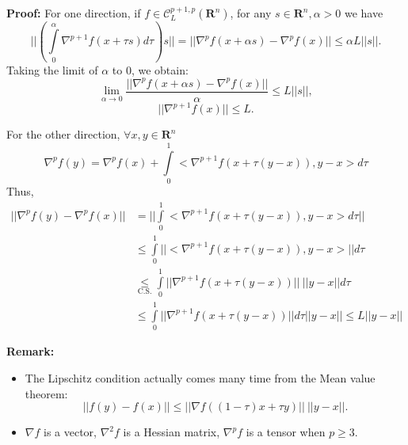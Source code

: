 \documentclass[12pt]{article}
\begin{document}
\textbf{Proof:} 
For one direction, if $f \in \mathcal{C}^{p+1,p}_L(\mathbf{R}^n)$, for any $s \in \mathbf{R}^n, \alpha >0$ we have
$$||(\int\limits_0^\alpha \nabla^{p+1}f(x+\tau s)d\tau )s|| = ||\nabla^p f(x+\alpha s)-\nabla^p f(x)|| \leq \alpha L||s||.$$
Taking the limit of $\alpha$ to 0, we obtain: 
$$\lim_{\alpha \rightarrow 0} \frac{||\nabla^p f(x+\alpha s)-\nabla^p f(x)||}{\alpha} \leq  L||s||,$$
$${\boxed{  || \nabla^{p+1} f(x) ||\leq L}}.$$

For the other direction, $\forall x,y \in \mathbf{R}^n$
$$\nabla^p f(y) =  \nabla^p f(x) + \int\limits_0^1 <\nabla^{p+1}f(x+ \tau (y-x)), y-x > d \tau $$
Thus, 
\begin{equation}
\begin{split}
||\nabla^p f(y)-\nabla^p f(x)|| &= ||\int\limits_0^1 <\nabla^{p+1}f(x+ \tau (y-x)), y-x > d \tau ||\\
    & \leq  \int\limits_0^1 ||<\nabla^{p+1}f(x+ \tau (y-x)), y-x > ||d \tau\\
    & \underset{\text{C.S.}}{\leq} \int\limits_0^1 ||\nabla^{p+1}f(x+ \tau (y-x)) ||\  ||y-x|| d \tau\\
    & \leq \int\limits_0^1 ||\nabla^{p+1}f(x+ \tau (y-x)) ||  d \tau||y-x|| \leq L||y-x|| 
\end{split}
\end{equation}

\textbf{Remark: } 
\begin{itemize}
    \item The Lipschitz condition actually comes many time from the Mean value theorem:
    $$||f(y)- f(x)||\leq ||\nabla f((1-\tau)x+\tau y)||\ ||y-x||.$$
    \item $\nabla f$ is a vector, $\nabla^2 f$ is a Hessian matrix, $\nabla^p f $ is a tensor when $p \geq 3$.
\end{itemize}
\end{document}

